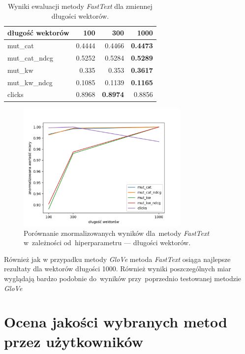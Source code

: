 \documentclass[pl]{minipw} %
\begin{document}
\begin{table}[H]
	\centering
	\begin{tabular}{lrrr}
		\hline
		długość wektorów &      100 &      300 &     1000 \\
		\hline
		mut\_cat      & 0.4444 & 0.4466 & \textbf{0.4473} \\
		mut\_cat\_ndcg & 0.5252 & 0.5284 & \textbf{0.5289} \\
		mut\_kw       & 0.335  & 0.353  & \textbf{0.3617} \\
		mut\_kw\_ndcg  & 0.1085 & 0.1139 & \textbf{0.1165} \\
		clicks       & 0.8968 & \textbf{0.8974} & 0.8856 \\
		\hline
	\end{tabular}
	\caption{Wyniki ewaluacji metody \textit{FastText} dla zmiennej długości wektorów.}
\end{table}

\begin{figure}[H]
	\centering
	\includegraphics[width=0.75\textwidth]{img/results/ft_ctr.png}
	\caption{Porównanie znormalizowanych wyników dla~metody \textit{FastText} w~zależności od~hiperparametru --- długości wektorów.}
\end{figure}

Również jak w przypadku metody \textit{GloVe} metoda \textit{FastText} osiąga najlepsze rezultaty dla wektorów długości 1000. Również wyniki poszczególnych miar wyglądają bardzo podobnie do~wyników przy~poprzednio testowanej metodzie \textit{GloVe}

\section{Ocena jakości wybranych metod przez użytkowników}
\end{document}
